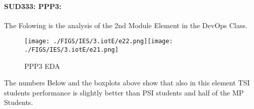 \documentclass[12pt]{extreport}
\begin{document}
\begin{comment}

\begin{enumerate}	
	\item The MP Class Box-Plot:
	\begin{enumerate}
		\item MAX = a {} {} {} {} {} {} {} {} UQ = b {} {} {} {} {} {} {} {} Median = c
		\item LQ = d {} {} {} {} {} {} {} {}  MIN =	l {} {} {} {} {} {} {} {}  IQR = e - f = g
	\end{enumerate}
	\item The PSI Class Box-Plot:
	\begin{enumerate}
		\item MAX = a {} {} {} {} {} {} {} {} UQ = b {} {} {} {} {} {} {} {} Median = c
		\item LQ = d {} {} {} {} {} {} {} {}  MIN =	e {} {} {} {} {} {} {} {} IQR = f - g = h	
	\end{enumerate}
	\item The TSI Class Box-Plot:
	\begin{enumerate}
		\item MAX = a {} {} {} {} {} {} {} {} UQ = b {} {} {} {} {} {} {} {} Median = c
		\item LQ = d {} {} {} {} {} {} {} {} MIN = e {} {} {} {} {} {} {} {} IQR = f - g = h	
	\end{enumerate}
\end{enumerate}
\end{comment}









\paragraph{\large SUD333: PPP3:\\
} 
The Folowing is the analysis of the 2nd Module Element in the DevOps Class.

\begin{figure}[H]
	\centering
	\texttt{[image: ./FIGS/IES/3.iotE/e22.png]}\texttt{[image: ./FIGS/IES/3.iotE/e21.png]}
	\caption{PPP3 EDA}
	\label{fig:31}
\end{figure}

The numbers Below and the boxplots above show that also in this element  TSI students performance is slightly better than PSI students and half of the MP Students.
\end{document}
